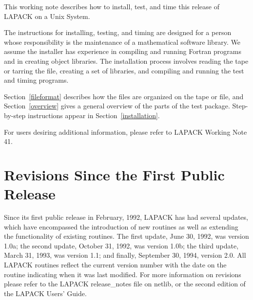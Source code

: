This working note describes how to install, test, and time this
release of LAPACK on a Unix System.

The instructions for installing, testing, and timing are designed for a 
person whose
responsibility is the maintenance of a mathematical software library.
We assume the installer has experience in compiling and running 
Fortran programs and in creating object libraries.
The installation process involves reading the tape or tarring the file, creating a set of
libraries, and compiling and running the test and timing programs.


Section~\ref{fileformat} describes how the files are organized on the tape
or file, and
Section~\ref{overview} gives a general overview of the parts of the test package.
Step-by-step instructions appear in Section~\ref{installation}.

For users desiring additional information, please refer to LAPACK
Working Note 41.

\section{Revisions Since the First Public Release}

\dent
Since its first public release in February, 1992, LAPACK has had
several updates, which have encompassed the introduction of new routines as
well as extending the functionality of existing routines.  The first update,
June 30, 1992, was version 1.0a; the second update, October 31, 1992,
was version 1.0b; the third update, March 31, 1993, was version 1.1; and
finally, September 30, 1994, version 2.0.  All LAPACK routines reflect the current
version number with the date 
on the routine indicating when it was last modified.
For more information on
revisions please refer to the LAPACK release\_notes file
on netlib, or the second edition of the LAPACK Users' Guide.

